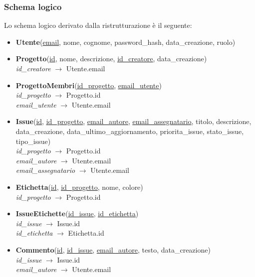 \subsubsection{Schema logico}
Lo schema logico derivato dalla ristrutturazione è il seguente:
\begin{itemize}
    \item \textbf{Utente}(\underline{email}, nome, cognome, password\_hash, data\_creazione, ruolo)

    \item \textbf{Progetto}(\underline{id}, nome, descrizione, \underline{\underline{id\_creatore}}, data\_creazione)\\
    \textit{id\_creatore} $\rightarrow$ Utente.email

    \item \textbf{ProgettoMembri}(\underline{\underline{\underline{id\_progetto}}}, \underline{\underline{\underline{email\_utente}}})\\
    \textit{id\_progetto} $\rightarrow$ Progetto.id\\
    \textit{email\_utente} $\rightarrow$ Utente.email

    \item \textbf{Issue}(\underline{id}, \underline{\underline{id\_progetto}}, \underline{\underline{email\_autore}}, \underline{\underline{email\_assegnatario}}, titolo, descrizione, data\_creazione, data\_ultimo\_aggiornamento, priorita\_issue, stato\_issue, tipo\_issue)\\
    \textit{id\_progetto} $\rightarrow$ Progetto.id\\
    \textit{email\_autore} $\rightarrow$ Utente.email\\
    \textit{email\_assegnatario} $\rightarrow$ Utente.email

    \item \textbf{Etichetta}(\underline{id}, \underline{\underline{id\_progetto}}, nome, colore)\\
    \textit{id\_progetto} $\rightarrow$ Progetto.id

    \item \textbf{IssueEtichette}(\underline{\underline{\underline{id\_issue}}}, \underline{\underline{\underline{id\_etichetta}}})\\
    \textit{id\_issue} $\rightarrow$ Issue.id\\
    \textit{id\_etichetta} $\rightarrow$ Etichetta.id

    \item \textbf{Commento}(\underline{id}, \underline{\underline{id\_issue}}, \underline{\underline{email\_autore}}, testo, data\_creazione)\\
    \textit{id\_issue} $\rightarrow$ Issue.id\\
    \textit{email\_autore} $\rightarrow$ Utente.email


\end{itemize}
